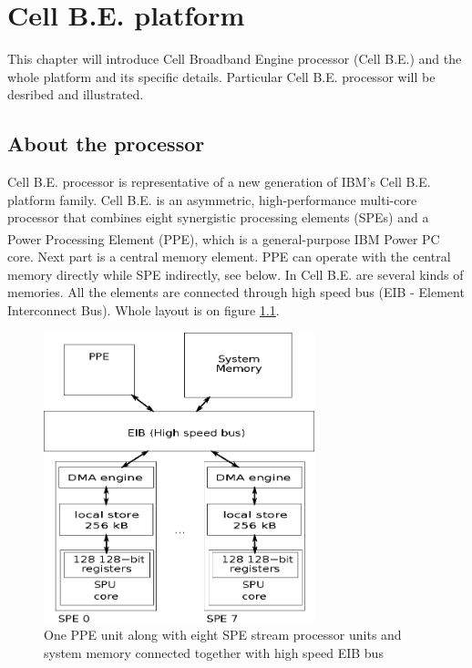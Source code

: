\chapter{Cell B.E. platform}

This chapter will introduce Cell Broadband Engine processor (Cell B.E.) and the whole platform and its specific details.
Particular Cell B.E. processor will be desribed and illustrated.

\section{About the processor}

Cell B.E. processor is representative of a new generation of IBM's Cell B.E. platform family.
Cell B.E. is an asymmetric, high-performance multi-core processor that combines eight synergistic processing elements (SPEs) and a Power Processing Element (PPE), which is a general-purpose IBM Power PC\textsuperscript{\textregistered} core.
Next part is a central memory element.
PPE can operate with the central memory directly while SPE indirectly, see below.
In Cell B.E. are several kinds of memories.
All the elements are connected through high speed bus (EIB - Element Interconnect Bus).
Whole layout is on figure \ref{fg:processorLayout}.

\begin{figure}
    \centering
    \includegraphics[width=0.7\textwidth]{data/cellLayout}
    \caption[Cell B.E. processor layout]{One PPE unit along with eight SPE stream processor units and system memory connected together with high speed EIB bus}
    \label{fg:processorLayout}
\end{figure}

